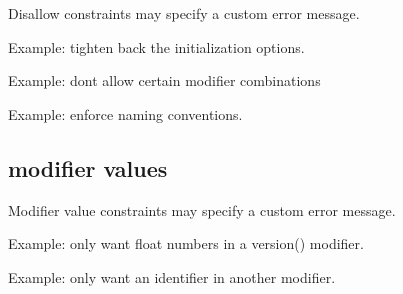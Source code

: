 Disallow constraints may specify a custom error message.

Example: tighten back the initialization options.

Example: dont allow certain modifier combinations

Example: enforce naming conventions.

\subsection{ modifier values }
\label{sec:concepts_modifier_values}

Modifier value constraints may specify a custom error message.

Example: only want float numbers in a version() modifier.

Example: only want an identifier in another modifier.

